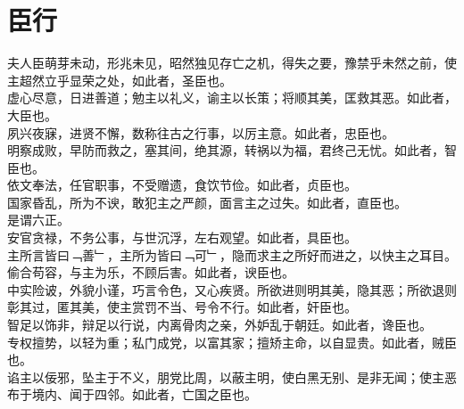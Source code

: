 \chapter{臣行}%
夫人臣萌芽未动，形兆未见，昭然独见存亡之机，得失之要，豫禁乎未然之前，使主超然立乎显荣之处，如此者，圣臣也。\\
虚心尽意，日进善道；勉主以礼义，谕主以长策；将顺其美，匡救其恶。如此者，大臣也。\\
夙兴夜寐，进贤不懈，数称往古之行事，以厉主意。如此者，忠臣也。
\\
明察成败，早防而救之，塞其间，绝其源，转祸以为福，君终己无忧。如此者，智臣也。\\
依文奉法，任官职事，不受赠遗，食饮节俭。如此者，贞臣也。\\
国家昏乱，所为不谀，敢犯主之严颜，面言主之过失。如此者，直臣也。\\
是谓六正。
\\
安官贪禄，不务公事，与世沉浮，左右观望。如此者，具臣也。\\
主所言皆曰﹁善﹂，主所为皆曰﹁可﹂，隐而求主之所好而进之，以快主之耳目。偷合苟容，与主为乐，不顾后害。如此者，谀臣也。\\
中实险诐，外貌小谨，巧言令色，又心疾贤。所欲进则明其美，隐其恶；所欲退则彰其过，匿其美，使主赏罚不当、号令不行。如此者，奸臣也。\\
智足以饰非，辩足以行说，内离骨肉之亲，外妒乱于朝廷。如此者，谗臣也。\\
专权擅势，以轻为重；私门成党，以富其家；擅矫主命，以自显贵。如此者，贼臣也。\\
谄主以佞邪，坠主于不义，朋党比周，以蔽主明，使白黑无别、是非无闻；使主恶布于境内、闻于四邻。如此者，亡国之臣也。\\

